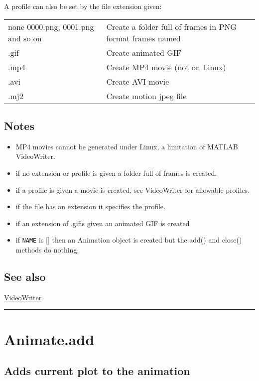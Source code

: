 A profile can also be set by the file extension given:

\begin{longtable}{lp{120mm}}
none          0000.png, 0001.png and so on & Create a folder full of frames in PNG format frames named\\ 
.gif & Create animated GIF\\ 
.mp4 & Create MP4 movie (not on Linux)\\ 
.avi & Create AVI movie\\ 
.mj2 & Create motion jpeg file\\ 
\end{longtable}\vspace{1ex}

\subsection*{Notes}
\begin{itemize}
  \item MP4 movies cannot be generated under Linux, a limitation of MATLAB VideoWriter.
  \item if no extension or profile is given a folder full of frames is created.
  \item if a profile is given a movie is created, see VideoWriter for allowable    profiles.
  \item if the file has an extension it specifies the profile.
  \item if an extension of \textquotesingle .gif\textquotesingle  is given an animated GIF is created
  \item if \texttt{NAME} is [] then an Animation object is created but the add() and close()    methods do nothing.
\end{itemize}

\subsection*{See also}


\hyperlink{VideoWriter}{\color{blue} VideoWriter}

\vspace{1.5ex}\hrule

\hypertarget{Animate.add}{\section*{Animate.add}}
\subsection*{Adds current plot to the animation}


